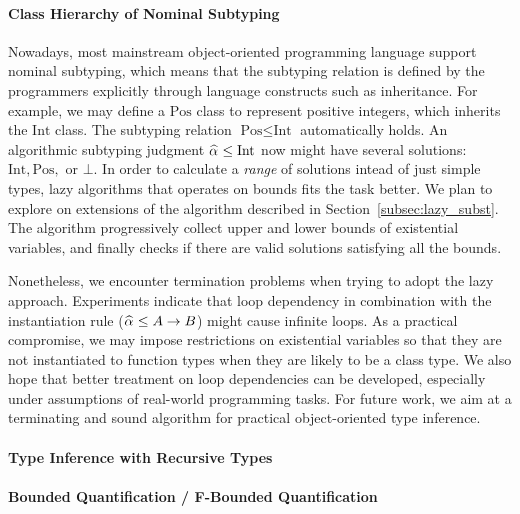 \paragraph{Class Hierarchy of Nominal Subtyping}
Nowadays, most mainstream object-oriented programming language
support nominal subtyping,
which means that the subtyping relation is defined by the programmers explicitly
through language constructs such as inheritance.
For example, we may define a $\text{Pos}$ class to represent positive integers,
which inherits the $\text{Int}$ class.
The subtyping relation $\text{Pos} \le \text{Int}$ automatically holds.
An algorithmic subtyping judgment $\al \le \text{Int}$
now might have several solutions: $\text{Int}, \text{Pos},$ or $\bot$.
In order to calculate a \emph{range} of solutions intead of
just simple types,
lazy algorithms that operates on bounds fits the task better.
We plan to explore on extensions of the algorithm described in Section~\ref{subsec:lazy_subst}.
The algorithm progressively collect upper and lower bounds of existential variables,
and finally checks if there are valid solutions satisfying all the bounds.

Nonetheless, we encounter termination problems when trying to adopt the lazy approach.
Experiments indicate that loop dependency in combination with the
instantiation rule ($\al \le A \to B$) might cause infinite loops.
As a practical compromise,
we may impose restrictions on existential variables
so that they are not instantiated to function types
when they are likely to be a class type.
We also hope that better treatment on loop dependencies can be
developed, especially under assumptions of real-world programming tasks.
For future work,
we aim at a terminating and sound algorithm for practical object-oriented type inference.


\paragraph{Type Inference with Recursive Types}



\paragraph{Bounded Quantification / F-Bounded Quantification}

